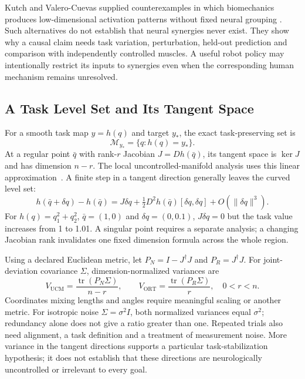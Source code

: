 Kutch and Valero-Cuevas supplied counterexamples in which biomechanics
produces low-dimensional activation patterns without fixed neural grouping
\cite{Kutch2012Synergies}. Such alternatives do not establish that neural
synergies never exist. They show why a causal claim needs task variation,
perturbation, held-out prediction and comparison with independently controlled
muscles. A useful robot policy may intentionally restrict its inputs to
synergies even when the corresponding human mechanism remains unresolved.

\subsection{A Task Level Set and Its Tangent Space}

For a smooth task map $y=h(q)$ and target $y_*$, the exact task-preserving set is
\begin{equation}
\mathcal M_{y_*}=\{q:h(q)=y_*\}.
\label{eq:ch8:ucm}
\end{equation}
At a regular point $\bar q$ with rank-$r$ Jacobian $J=Dh(\bar q)$, its tangent
space is $\ker J$ and has dimension $n-r$. The local uncontrolled-manifold
analysis uses this linear approximation~\cite{Scholz1999}. A finite step
in a tangent direction generally leaves the curved level set:
\begin{equation}
h(\bar q+\delta q)-h(\bar q)
=J\delta q+\tfrac12 D^2h(\bar q)[\delta q,\delta q]
+O(\|\delta q\|^3).
\end{equation}
For $h(q)=q_1^2+q_2^2$, $\bar q=(1,0)$ and $\delta q=(0,0.1)$,
$J\delta q=0$ but the task value increases from 1 to 1.01. A singular point
requires a separate analysis; a changing Jacobian rank invalidates one fixed
dimension formula across the whole region.

Using a declared Euclidean metric, let $P_N=I-J^\dagger J$ and
$P_R=J^\dagger J$. For joint-deviation covariance $\Sigma$, dimension-normalized
variances are
\begin{equation}
V_{\mathrm{UCM}}=\frac{\operatorname{tr}(P_N\Sigma)}{n-r},\qquad
V_{\mathrm{ORT}}=\frac{\operatorname{tr}(P_R\Sigma)}{r},
\quad 0<r<n.
\label{eq:ch8:ucm-variance}
\end{equation}
Coordinates mixing lengths and angles require meaningful scaling or another
metric. For isotropic noise $\Sigma=\sigma^2I$, both normalized variances equal
$\sigma^2$; redundancy alone does not give a ratio greater than one. Repeated
trials also need alignment, a task definition and a treatment of measurement
noise. More variance in the tangent directions supports a particular
task-stabilization hypothesis; it does not establish that these directions
are neurologically uncontrolled or irrelevant to every goal.


